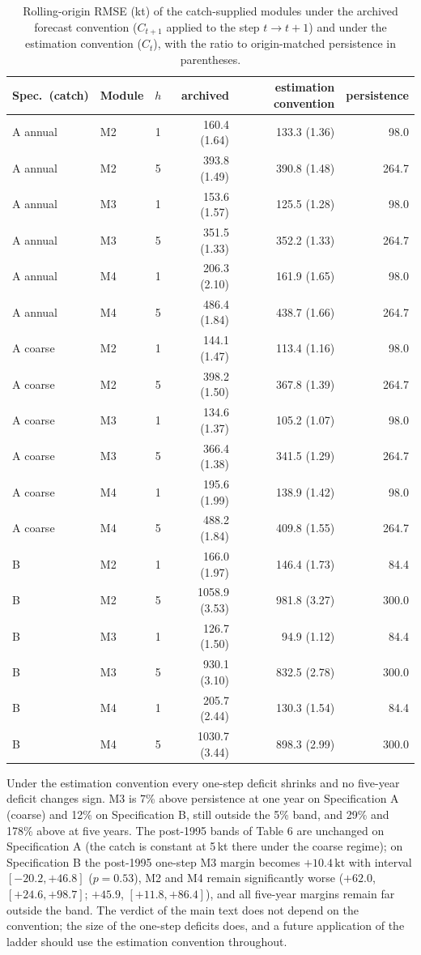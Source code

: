 \documentclass[preprint,11pt,authoryear]{elsarticle}
\theoremstyle{remark}
\newcommand{\kt}{\,\mathrm{kt}}
\begin{document}
\begin{table}[!htb]
\centering\small
\caption{Rolling-origin RMSE (kt) of the catch-supplied modules under the archived forecast convention ($C_{t+1}$ applied to the step $t\to t+1$) and under the estimation convention ($C_t$), with the ratio to origin-matched persistence in parentheses.}
\label{tab:si_timing}
\begin{tabular}{@{}llcrrr@{}}
\toprule
Spec.\ (catch) & Module & $h$ & archived & estimation convention & persistence \\
\midrule
A annual & M2 & 1 & 160.4 (1.64) & 133.3 (1.36) & 98.0 \\
A annual & M2 & 5 & 393.8 (1.49) & 390.8 (1.48) & 264.7 \\
A annual & M3 & 1 & 153.6 (1.57) & 125.5 (1.28) & 98.0 \\
A annual & M3 & 5 & 351.5 (1.33) & 352.2 (1.33) & 264.7 \\
A annual & M4 & 1 & 206.3 (2.10) & 161.9 (1.65) & 98.0 \\
A annual & M4 & 5 & 486.4 (1.84) & 438.7 (1.66) & 264.7 \\
A coarse & M2 & 1 & 144.1 (1.47) & 113.4 (1.16) & 98.0 \\
A coarse & M2 & 5 & 398.2 (1.50) & 367.8 (1.39) & 264.7 \\
A coarse & M3 & 1 & 134.6 (1.37) & 105.2 (1.07) & 98.0 \\
A coarse & M3 & 5 & 366.4 (1.38) & 341.5 (1.29) & 264.7 \\
A coarse & M4 & 1 & 195.6 (1.99) & 138.9 (1.42) & 98.0 \\
A coarse & M4 & 5 & 488.2 (1.84) & 409.8 (1.55) & 264.7 \\
B & M2 & 1 & 166.0 (1.97) & 146.4 (1.73) & 84.4 \\
B & M2 & 5 & 1058.9 (3.53) & 981.8 (3.27) & 300.0 \\
B & M3 & 1 & 126.7 (1.50) & 94.9 (1.12) & 84.4 \\
B & M3 & 5 & 930.1 (3.10) & 832.5 (2.78) & 300.0 \\
B & M4 & 1 & 205.7 (2.44) & 130.3 (1.54) & 84.4 \\
B & M4 & 5 & 1030.7 (3.44) & 898.3 (2.99) & 300.0 \\
\bottomrule
\end{tabular}
\end{table}

Under the estimation convention every one-step deficit shrinks and no five-year deficit changes sign. M3 is 7\% above persistence at one year on Specification A (coarse) and 12\% on Specification B, still outside the 5\% band, and 29\% and 178\% above at five years. The post-1995 bands of Table 6 are unchanged on Specification A (the catch is constant at 5\,kt there under the coarse regime); on Specification B the post-1995 one-step M3 margin becomes $+10.4\kt$ with interval $[-20.2, +46.8]$ ($p = 0.53$), M2 and M4 remain significantly worse ($+62.0$, $[+24.6, +98.7]$; $+45.9$, $[+11.8, +86.4]$), and all five-year margins remain far outside the band. The verdict of the main text does not depend on the convention; the size of the one-step deficits does, and a future application of the ladder should use the estimation convention throughout.
\end{document}
